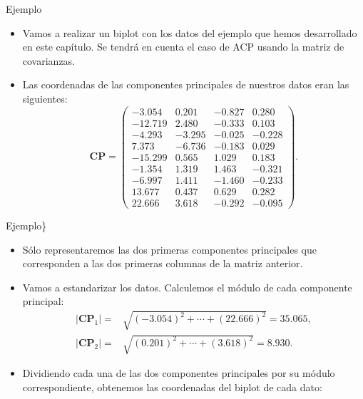 \documentclass[
  spanish,
  ignorenonframetext,
]{beamer}
\providecommand{\tightlist}{%
  \setlength{\itemsep}{0pt}\setlength{\parskip}{0pt}}
\begin{document}
\begin{frame}{Ejemplo}
\protect\hypertarget{ejemplo-24}{}
\begin{itemize}
\tightlist
\item
  Vamos a realizar un biplot con los datos del ejemplo que hemos
  desarrollado en este capítulo. Se tendrá en cuenta el caso de ACP
  usando la matriz de covarianzas.
\item
  Las coordenadas de las componentes principales de nuestros datos eran
  las siguientes: \[
  \mathbf{CP}= 
  \left(
  \begin{array}{rrrr}
  -3.054 & 0.201 & -0.827 & 0.280 \\
   -12.719 & 2.480 & -0.333 & 0.103 \\
   -4.293 & -3.295 & -0.025 & -0.228 \\
   7.373 & -6.736 & -0.183 & 0.029 \\
   -15.299 & 0.565 & 1.029 & 0.183 \\
   -1.354 & 1.319 & 1.463 & -0.321 \\
   -6.997 & 1.411 & -1.460 & -0.233 \\
   13.677 & 0.437 & 0.629 & 0.282 \\
   22.666 & 3.618 & -0.292 & -0.095 
  \end{array}
  \right).
  \]
\end{itemize}
\end{frame}

\begin{frame}{Ejemplo\}}
\protect\hypertarget{ejemplo-25}{}
\begin{itemize}
\tightlist
\item
  Sólo representaremos las dos primeras componentes principales que
  corresponden a las dos primeras columnas de la matriz anterior.
\item
  Vamos a estandarizar los datos. Calculemos el módulo de cada
  componente principal: \[
  \begin{array}{rl}
  |\mathbf{CP}_1|= & \sqrt{(-3.054)^2+\cdots +(22.666)^2} = 35.065, \\
  |\mathbf{CP}_2|= & \sqrt{(0.201)^2+\cdots +(3.618)^2} = 8.930.
  \end{array}
  \]
\item
  Dividiendo cada una de las dos componentes principales por su módulo
  correspondiente, obtenemos las coordenadas del biplot de cada dato:
\end{itemize}
\end{frame}
\end{document}
